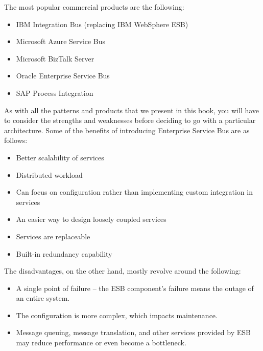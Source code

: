 The most popular commercial products are the following:

\begin{itemize}
\item 
IBM Integration Bus (replacing IBM WebSphere ESB)

\item 
Microsoft Azure Service Bus

\item 
Microsoft BizTalk Server

\item 
Oracle Enterprise Service Bus

\item 
SAP Process Integration
\end{itemize}

As with all the patterns and products that we present in this book, you will have to consider the strengths and weaknesses before deciding to go with a particular architecture. Some of the benefits of introducing Enterprise Service Bus are as follows:

\begin{itemize}
\item 
Better scalability of services

\item 
Distributed workload

\item 
Can focus on configuration rather than implementing custom integration in services

\item 
An easier way to design loosely coupled services

\item 
Services are replaceable

\item 
Built-in redundancy capability
\end{itemize}

The disadvantages, on the other hand, mostly revolve around the following:

\begin{itemize}
\item 
A single point of failure – the ESB component's failure means the outage of an entire system.

\item 
The configuration is more complex, which impacts maintenance.

\item 
Message queuing, message translation, and other services provided by ESB may reduce performance or even become a bottleneck.
\end{itemize}

